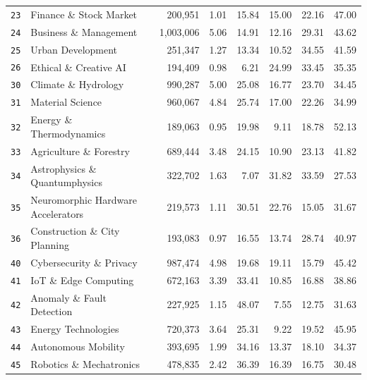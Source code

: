 \begin{longtable}{@{}l l r r r r r r@{}}
\texttt{23} & Finance \& Stock Market & 200,951 & 1.01 & 15.84 & 15.00 & 22.16 & 47.00 \\
\texttt{24} & Business \& Management & 1,003,006 & 5.06 & 14.91 & 12.16 & 29.31 & 43.62 \\
\texttt{25} & Urban Development & 251,347 & 1.27 & 13.34 & 10.52 & 34.55 & 41.59 \\
\texttt{26} & Ethical \& Creative AI & 194,409 & 0.98 & 6.21 & 24.99 & 33.45 & 35.35 \\
\texttt{30} & Climate \& Hydrology & 990,287 & 5.00 & 25.08 & 16.77 & 23.70 & 34.45 \\
\texttt{31} & Material Science & 960,067 & 4.84 & 25.74 & 17.00 & 22.26 & 34.99 \\
\texttt{32} & Energy \& Thermodynamics & 189,063 & 0.95 & 19.98 & 9.11 & 18.78 & 52.13 \\
\texttt{33} & Agriculture \& Forestry & 689,444 & 3.48 & 24.15 & 10.90 & 23.13 & 41.82 \\
\texttt{34} & Astrophysics \& Quantumphysics & 322,702 & 1.63 & 7.07 & 31.82 & 33.59 & 27.53 \\
\texttt{35} & Neuromorphic Hardware Accelerators & 219,573 & 1.11 & 30.51 & 22.76 & 15.05 & 31.67 \\
\texttt{36} & Construction \& City Planning & 193,083 & 0.97 & 16.55 & 13.74 & 28.74 & 40.97 \\
\texttt{40} & Cybersecurity \& Privacy & 987,474 & 4.98 & 19.68 & 19.11 & 15.79 & 45.42 \\
\texttt{41} & IoT \& Edge Computing & 672,163 & 3.39 & 33.41 & 10.85 & 16.88 & 38.86 \\
\texttt{42} & Anomaly \& Fault Detection & 227,925 & 1.15 & 48.07 & 7.55 & 12.75 & 31.63 \\
\texttt{43} & Energy Technologies & 720,373 & 3.64 & 25.31 & 9.22 & 19.52 & 45.95 \\
\texttt{44} & Autonomous Mobility & 393,695 & 1.99 & 34.16 & 13.37 & 18.10 & 34.37 \\
\texttt{45} & Robotics \& Mechatronics & 478,835 & 2.42 & 36.39 & 16.39 & 16.75 & 30.48 \\
\end{longtable}

